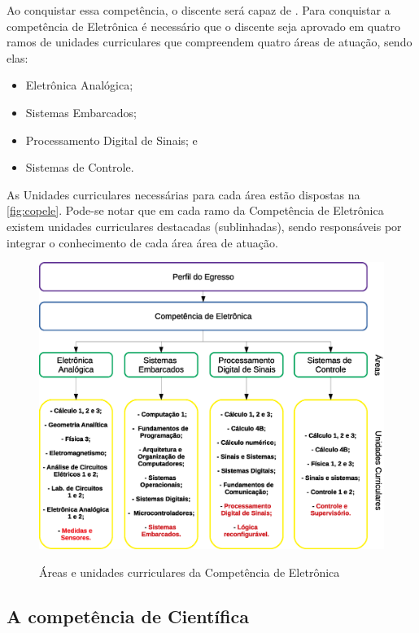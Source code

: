 Ao conquistar essa competência, o discente será capaz de \textbf{\compTron}. Para conquistar a competência de Eletrônica é necessário que o discente seja aprovado em quatro ramos de unidades curriculares que compreendem quatro áreas de atuação, sendo elas:

\begin{itemize}
    \item Eletrônica Analógica;
    \item Sistemas Embarcados;
    \item Processamento Digital de Sinais; e
    \item Sistemas de Controle.
\end{itemize}

As Unidades curriculares necessárias para cada área estão dispostas na \autoref{fig:copele}. Pode-se notar que em cada ramo da Competência de Eletrônica existem unidades curriculares destacadas (sublinhadas), sendo responsáveis por integrar o conhecimento de cada área área de atuação.

\begin{figure}[!htb]
    \centering
    \caption[Áreas e unidades curriculares da Competência de Eletrônica]{Áreas e unidades curriculares da Competência de Eletrônica}
    \includegraphics[width=1.0\textwidth]{Caps/Figs/comp_eletronica.eps}
    \fonte{\utf}
    \label{fig:copele}
\end{figure}

\subsection{A competência de Científica}

